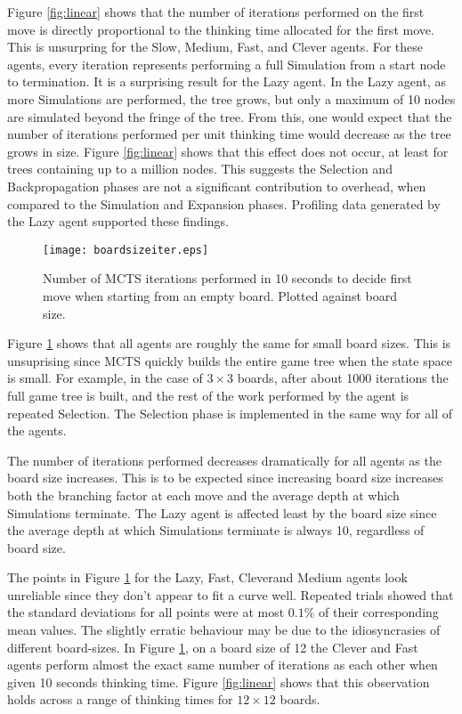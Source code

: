 Figure \ref{fig:linear} shows that the number of iterations performed on the first move is directly proportional to the thinking time allocated for the first move. This is unsurpring for the {Slow}, {Medium}, {Fast}, and {Clever} agents. For these agents, every iteration represents performing a full Simulation from a start node to termination. It is a surprising result for the {Lazy} agent. In the {Lazy} agent, as more Simulations are performed, the tree grows, but only a maximum of 10 nodes are simulated beyond the fringe of the tree. From this, one would expect that the number of iterations performed per unit thinking time would decrease as the tree grows in size. Figure \ref{fig:linear} shows that this effect does not occur, at least for trees containing up to a million nodes. This suggests the Selection and Backpropagation phases are not a significant contribution to overhead, when compared to the Simulation and Expansion phases. Profiling data generated by the {Lazy} agent supported these findings.

\begin{figure}
\centering
{\texttt{[image: boardsizeiter.eps]}}
\caption{Number of {MCTS} iterations performed in 10 seconds to decide first move when starting from an empty board. Plotted against board size.\label{fig:boardsize}}
\end{figure}

Figure \ref{fig:boardsize} shows that all agents are roughly the same for small board sizes. This is unsuprising since {MCTS} quickly builds the entire game tree when the state space is small. For example, in the case of $3 \times 3$ boards, after about 1000 iterations the full game tree is built, and the rest of the work performed by the agent is repeated Selection. The Selection phase is implemented in the same way for all of the agents. 

The number of iterations performed decreases dramatically for all agents as the board size increases. This is to be expected since increasing board size increases both the branching factor at each move and the average depth at which Simulations terminate. The {Lazy} agent is affected least by the board size since the average depth at which Simulations terminate is always 10, regardless of board size.

The points in Figure \ref{fig:boardsize} for the {Lazy}, {Fast}, {Clever}and {Medium} agents look unreliable since they don't appear to fit a curve well. Repeated trials showed that the standard deviations for all points were at most $0.1\%$ of their corresponding mean values. The slightly erratic behaviour may be due to the idiosyncrasies of different board-sizes. In Figure \ref{fig:boardsize}, on a board size of 12 the {Clever} and {Fast} agents perform almost the exact same number of iterations as each other when given 10 seconds thinking time. Figure \ref{fig:linear} shows that this observation holds across a range of thinking times for $12 \times 12$ boards. 

